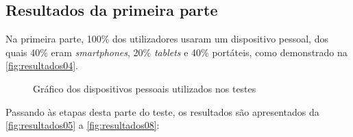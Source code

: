 \documentclass[11pt,twoside,a4paper]{report}
\begin{document}
\subsection{Resultados da primeira parte}
Na primeira parte, 100\% dos utilizadores usaram um dispositivo pessoal, dos quais 40\% eram \textit{smartphones}, 20\% \textit{tablets} e 40\% portáteis, como demonstrado na \autoref{fig:resultados04}.
\begin{figure}[H]
	\centering
	\caption{Gráfico dos dispositivos pessoais utilizados nos testes}
	\label{fig:resultados04}
\end{figure}
Passando às etapas desta parte do teste, os resultados são apresentados da \autoref{fig:resultados05} a \autoref{fig:resultados08}:
\end{document}
